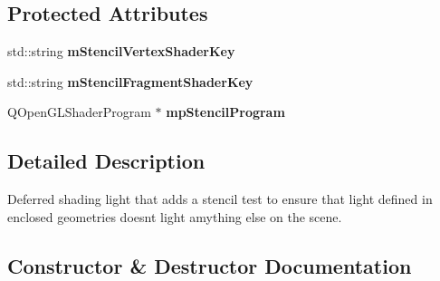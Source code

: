 \subsection*{Protected Attributes}
\begin{DoxyCompactItemize}
\item 
\mbox{\label{class_geometry_engine_1_1_geometry_world_item_1_1_geometry_light_1_1_stencil_test_light_af03b50a79e930d4377d09a039df44326}} 
std\+::string {\bfseries m\+Stencil\+Vertex\+Shader\+Key}
\item 
\mbox{\label{class_geometry_engine_1_1_geometry_world_item_1_1_geometry_light_1_1_stencil_test_light_a285152fe65ddc2649a886175d63d9163}} 
std\+::string {\bfseries m\+Stencil\+Fragment\+Shader\+Key}
\item 
\mbox{\label{class_geometry_engine_1_1_geometry_world_item_1_1_geometry_light_1_1_stencil_test_light_a320b6418a7c0275039ba7604e95fd9f3}} 
Q\+Open\+G\+L\+Shader\+Program $\ast$ {\bfseries mp\+Stencil\+Program}
\end{DoxyCompactItemize}


\subsection{Detailed Description}
Deferred shading light that adds a stencil test to ensure that light defined in enclosed geometries doesn\textquotesingle{}t light amything else on the scene. 

\subsection{Constructor \& Destructor Documentation}
\mbox{\label{class_geometry_engine_1_1_geometry_world_item_1_1_geometry_light_1_1_stencil_test_light_af2846d81fd5ca495ad936e6ebafd4772}} 

